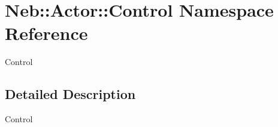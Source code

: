 \hypertarget{namespaceNeb_1_1Actor_1_1Control}{\section{Neb\-:\-:Actor\-:\-:Control Namespace Reference}
\label{namespaceNeb_1_1Actor_1_1Control}
}


Control  




\subsection{Detailed Description}
Control 